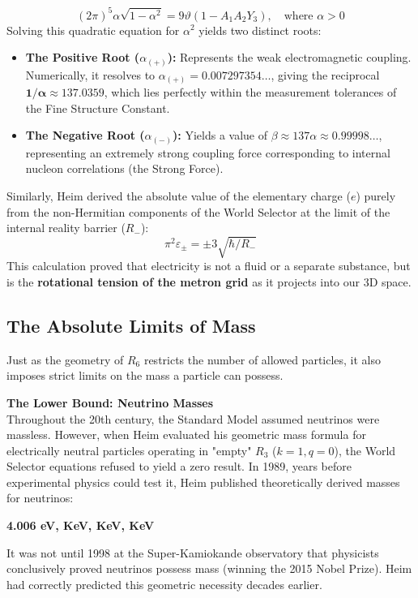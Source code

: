 \documentclass[11pt,a4paper,oneside]{article}
\begin{document}
\begin{tcolorbox}[colback=white, colframe=theoryblue, title=\textbf{The Geometric Derivation of Alpha}]
\begin{equation}
    (2\pi)^5 \alpha \sqrt{1-\alpha^2} = 9\vartheta(1 - A_1 A_2 Y_3), \quad \text{where } \alpha > 0
\end{equation}
Solving this quadratic equation for $\alpha^2$ yields two distinct roots:
\begin{itemize}
    \item \textbf{The Positive Root ($\alpha_{(+)}$):} Represents the weak electromagnetic coupling. Numerically, it resolves to $\alpha_{(+)} = 0.007297354\dots$, giving the reciprocal $\mathbf{1/\alpha \approx 137.0359}$, which lies perfectly within the measurement tolerances of the Fine Structure Constant.
    \item \textbf{The Negative Root ($\alpha_{(-)}$):} Yields a value of $\beta \approx 137\alpha \approx 0.99998\dots$, representing an extremely strong coupling force corresponding to internal nucleon correlations (the Strong Force).
\end{itemize}
\end{tcolorbox}

Similarly, Heim derived the absolute value of the elementary charge ($e$) purely from the non-Hermitian components of the World Selector at the limit of the internal reality barrier ($R_-$):
\begin{equation}
    \pi^2 \varepsilon_\pm = \pm 3 \sqrt{\hbar / R_-}
\end{equation}
This calculation proved that electricity is not a fluid or a separate substance, but is the \textbf{rotational tension of the metron grid} as it projects into our 3D space.
\subsection{The Absolute Limits of Mass}
Just as the geometry of $R_6$ restricts the number of allowed particles, it also imposes strict limits on the mass a particle can possess.

\begin{mbbcite}
    \textbf{The Lower Bound: Neutrino Masses}\\
    Throughout the 20th century, the Standard Model assumed neutrinos were massless. However, when Heim evaluated his geometric mass formula for electrically neutral particles operating in "empty" $R_3$ ($k=1, q=0$), the World Selector equations refused to yield a zero result. In 1989, years before experimental physics could test it, Heim published theoretically derived masses for neutrinos:
    \begin{center}
        \textbf{4.006 eV,  KeV,  KeV,  KeV}
    \end{center}
    It was not until 1998 at the Super-Kamiokande observatory that physicists conclusively proved neutrinos possess mass (winning the 2015 Nobel Prize). Heim had correctly predicted this geometric necessity decades earlier.
\end{mbbcite}
\end{document}
